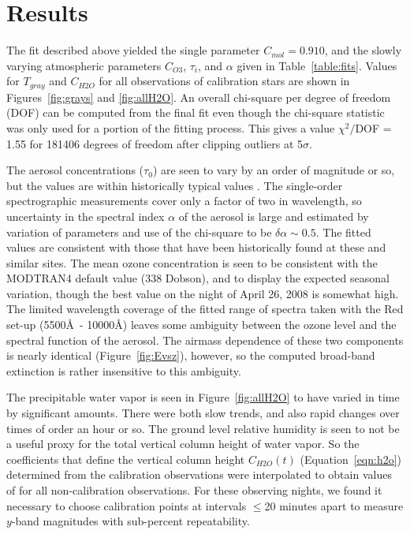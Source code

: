 \documentclass[manuscript]{aastex}
\begin{document}
\section{Results}

The fit described above yielded the single parameter $C_{mol} = 0.910$,
and the slowly varying atmospheric parameters $C_{O3}$, $\tau_{i}$, and $\alpha$ given in Table~\ref{table:fits}.
Values for $T_{gray}$ and $C_{H2O}$ for all observations of calibration stars are shown in Figures~\ref{fig:grays} and \ref{fig:allH2O}.
An overall chi-square per degree of freedom (DOF) can be computed from the final fit even though the chi-square statistic was only used
for a portion of the fitting process. 
This gives a value $\chi^2/$DOF = 1.55 for 181406 degrees of freedom after clipping outliers at 5$\sigma$.  

The aerosol concentrations ($\tau_{0}$) are seen to vary by an order of magnitude or so, but the values are within
historically typical values \cite{gutierrez86} \cite{burki95}. 
The single-order spectrographic measurements cover only a factor of two in wavelength, so uncertainty in the spectral index $\alpha$ of the aerosol
is large and estimated by variation of parameters and use of the chi-square to be $\delta \alpha \sim 0.5$.
The fitted values are consistent with those that have been historically found at these and similar sites.
The mean ozone concentration is seen to be consistent with the MODTRAN4 default value (338 Dobson),
and to display the expected seasonal variation, though the best value on the night of April 26, 2008 is somewhat high.
The limited wavelength coverage of the fitted range of spectra taken with the Red set-up (5500\AA~- 10000\AA) 
leaves some ambiguity between the ozone level and the spectral function of the aerosol.
The airmass dependence of these two components is nearly identical (Figure~\ref{fig:Evsz}), however,
so the computed broad-band extinction is rather insensitive to this ambiguity. 

The precipitable water vapor is seen in Figure~\ref{fig:allH2O} to have varied in time by significant amounts.
There were both slow trends, and also rapid changes over times of order an hour or so.
The ground level relative humidity is seen to not be a useful proxy for the total vertical column height of water vapor.
So the coefficients that define the vertical column height $C_{H2O}(t)$ (Equation~\ref{eqn:h2o}) determined from the calibration observations
were interpolated to obtain values of for all non-calibration observations.
For these observing nights, we found it necessary to choose calibration points at intervals $\le$20 minutes apart to measure $y$-band 
magnitudes with sub-percent repeatability.
\end{document}

